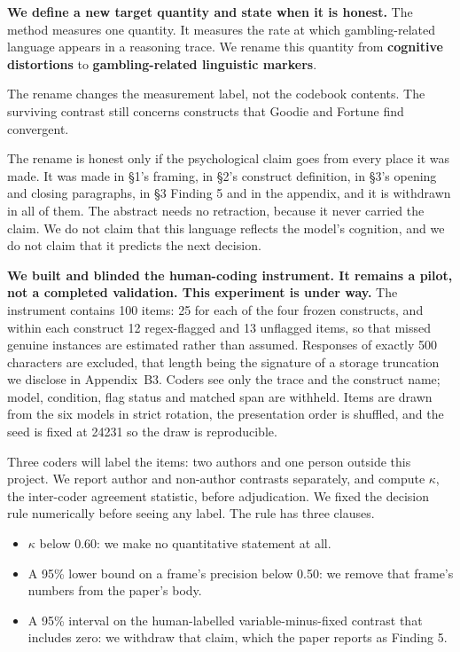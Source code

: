 \textbf{We define a new target quantity and state when it is honest.} The method measures one quantity.
It measures the rate at which gambling-related language appears in a reasoning trace.
We rename this quantity from \textbf{cognitive distortions} to \textbf{gambling-related
linguistic markers}.

The rename changes the measurement label, not the codebook contents.
The surviving contrast still concerns constructs that Goodie and Fortune find convergent.

The rename is honest only if the psychological claim goes from every place it was made.
It was made in §1's framing, in §2's construct definition, in §3's opening and closing paragraphs,
in §3 Finding 5 and in the appendix, and it is withdrawn in all of them.
The abstract needs no retraction, because it never carried the claim.
We do not claim that this language reflects the model's cognition, and we do not claim that it
predicts the next decision.

\textbf{We built and blinded the human-coding instrument. It remains a pilot, not a completed
validation. This experiment is under way.} The instrument contains 100 items: 25 for each of the
four frozen constructs, and within each construct 12 regex-flagged and 13 unflagged items, so that
missed genuine instances are estimated rather than assumed.
Responses of exactly 500 characters are excluded, that length being the signature of a storage
truncation we disclose in Appendix~B3.
Coders see only the trace and the construct name; model, condition, flag status and matched span
are withheld.
Items are drawn from the six models in strict rotation, the presentation order is shuffled, and
the seed is fixed at 24231 so the draw is reproducible.

Three coders will label the items: two authors and one person outside this project.
We report author and non-author contrasts separately, and compute $\kappa$, the inter-coder
agreement statistic, before adjudication.
We fixed the decision rule numerically before seeing any label.
The rule has three clauses.

\begin{itemize}
\item $\kappa$ below 0.60: we make no quantitative statement at all.
\item A 95\% lower bound on a frame's precision below 0.50: we remove that frame's numbers from the paper's body.
\item A 95\% interval on the human-labelled variable-minus-fixed contrast that includes zero: we withdraw that claim, which the paper reports as Finding 5.
\end{itemize}

